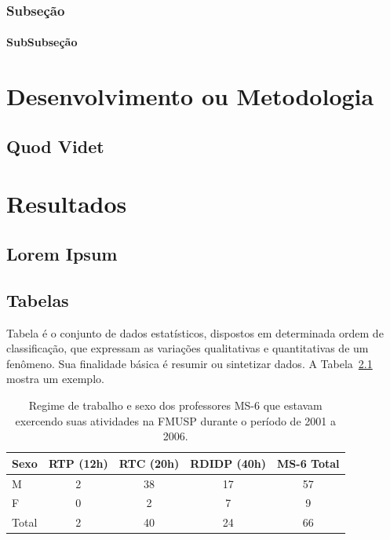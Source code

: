 \documentclass[
12pt,        %
openright,   %
twoside,     %
a4paper,     %
english,       %
brazil,        %
%
%
]{ppgca}
\begin{document}
\lipsum[9-10]

\subsection{Subseção}

\subsubsection{SubSubseção}

\chapter{Desenvolvimento ou Metodologia}

\section{Quod Videt} %

\lipsum[3-4]

\chapter{Resultados}

\section{Lorem Ipsum}

\lipsum[5-6]

\section{Tabelas}

Tabela é o conjunto de dados estatísticos, dispostos em determinada
ordem de classificação, que expressam as variações qualitativas e
quantitativas de um fenômeno. Sua finalidade básica é resumir ou
sintetizar dados. A Tabela~\ref{tab:regime} mostra um exemplo.

\begin{table}[h]
\caption{Regime de trabalho e sexo dos professores MS-6 que estavam
  exercendo suas atividades na FMUSP durante o período de 2001 a 2006.}
\label{tab:regime}
  \centering
\begin{tabular}{l|c|c|c|c}\hline
 Sexo & RTP (12h) &  RTC (20h) & RDIDP (40h) & MS-6  Total \\\hline
M     &  2        &  38       &  17         & 57          \\
F    &  0        &   2       &   7         &  9          \\
Total&  2        &   40      &   24        &  66         \\\hline
\end{tabular}
\end{table}
\end{document}
